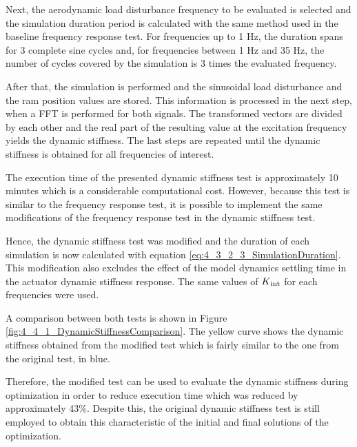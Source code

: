 Next, the aerodynamic load disturbance frequency to be evaluated is selected and the simulation duration period is calculated with the same method used in the baseline frequency response test. For frequencies up to 1 Hz, the duration spans for 3 complete sine cycles and, for frequencies between 1 Hz and 35 Hz, the number of cycles covered by the simulation is 3 times the evaluated frequency.

After that, the simulation is performed and the sinusoidal load disturbance and the ram position values are stored. This information is processed in the next step, when a FFT is performed for both signals. The transformed vectors are divided by each other and the real part of the resulting value at the excitation frequency yields the dynamic stiffness. The last steps are repeated until the dynamic stiffness is obtained for all frequencies of interest.

The execution time of the presented dynamic stiffness test is approximately 10 minutes which is a considerable computational cost. However, because this test is similar to the frequency response test, it is possible to implement the same modifications of the frequency response test in the dynamic stiffness test. 

Hence, the dynamic stiffness test was modified and the duration of each simulation is now calculated with equation \ref{eq:4_3_2_3_SimulationDuration}. This modification also excludes the effect of the model dynamics settling time in the actuator dynamic stiffness response. The same values of $K\textsubscript{int}$ for each frequencies were used. 

A comparison between both tests is shown in Figure \ref{fig:4_4_1_DynamicStiffnessComparison}. The yellow curve shows the dynamic stiffness obtained from the modified test which is fairly similar to the one from the original test, in blue. 

Therefore, the modified test can be used to evaluate the dynamic stiffness during optimization in order to reduce execution time which was reduced by approximately 43\%. Despite this, the original dynamic stiffness test is still employed to obtain this characteristic of the initial and final solutions of the optimization.

